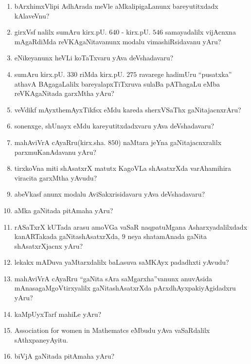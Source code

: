\begin{enumerate}
\item bArxhimxVlipi AdhArada meVle aMkalipigaLanunx bareyutitxdadx kAlaveVnu? 
  
\item girxVsf nalilx sumAru kirx.pU. $640$ - kirx.pU. $546$ samayadalilx vijAcnxna mAgaRdiMda reVKAgaNitavanunx modalu vimashiRsidavanu yAru?
  
\item eNikeyanunx heVLi koTaTxvaru yAva deVshadavaru?

\item sumAru kirx.pU. $330$ riMda kirx.pU. $275$ ravarege hadimUru ``pusatxka'' athavA BAgagaLalilx bareyalapxTiTxruva sulaBa pAThagaLu eMba reVKAgaNitada garxMtha yAru?
  
\item veVdikf mAyxthemAyxTikfsx eMdu kareda sherxVSaThx gaNitajacnxrAru?
  
\item sonenxge, shUnayx eMdu kareyutitxdadxvaru yAva deVshadavaru?
  
\item mahAviVrA cAyaRru(kirx.sha. $850$) naMtara jeYna gaNitajacnxralilx parxmuKanAdavanu yAru?
  
\item tirxkoVna miti shAsatxrX matutx KagoVLa shAsatxrXda varAhamihira viracita garxMtha yAvudu?
  
\item abeVkasf anunx modalu AviSakxrisidavaru yAva deVshadavaru?
  
\item aMka gaNitada pitAmaha yAru?

\item rASaTxrX kUTada arasu amoVGa vaSaR naqpatuMgana Asharxyadalilxdadx kanARTakada gaNitashAsatxrXda, $9$ neya shatamAnada gaNita shAsatxrXjacnx yAru?

\item lekakx mADuva yaMtarxdalilx baLasuva saMKAyx padadhxti yAvudu?
  
\item mahAviVrA cAyaRru ``gaNita sAra saMgarxha''vanunx anuvAsida mAnasagaMgoVtirxyalilx gaNitashAsatxrXda pArxdhAyxpakiyAgidadxru yAru? 
  
\item kaMpUyxTarf mahiLe yAru?
  
\item {\rm Association for women in Mathematcs} eMbudu yAva vaSaRdalilx sAthxpaneyAyitu.
  
\item biVjA gaNitada pitAmaha yAru?
  

\end{enumerate}
